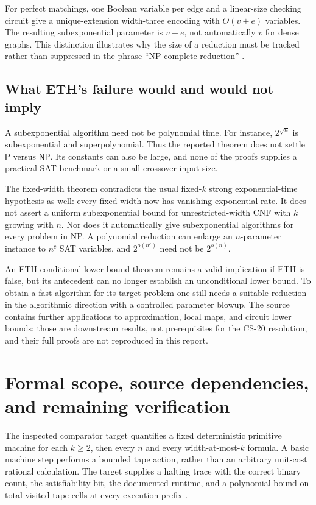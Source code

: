 \documentclass[11pt,a4paper]{article}
\numberwithin{equation}{section}
\theoremstyle{definition}
\theoremstyle{remark}
\begin{document}
For perfect matchings, one Boolean variable per edge and a linear-size
checking circuit give a unique-extension width-three encoding with
$O(v+e)$ variables. The resulting subexponential parameter is $v+e$, not
automatically $v$ for dense graphs. This distinction illustrates why the
size of a reduction must be tracked rather than suppressed in the phrase
``NP-complete reduction'' \cite{paper}.

\subsection{What ETH's failure would and would not imply}
A subexponential algorithm need not be polynomial time. For instance,
$2^{\sqrt n}$ is subexponential and superpolynomial. Thus the reported theorem
does not settle $\mathsf P$ versus $\mathsf{NP}$. Its constants can also be
large, and none of the proofs supplies a practical SAT benchmark or a small
crossover input size.

The fixed-width theorem contradicts the usual fixed-$k$ strong exponential-time
hypothesis as well: every fixed width now has vanishing exponential rate.
It does not assert a uniform subexponential bound for unrestricted-width CNF
with $k$ growing with $n$. Nor does it automatically give subexponential
algorithms for every problem in NP. A polynomial reduction can enlarge an
$n$-parameter instance to $n^c$ SAT variables, and $2^{o(n^c)}$ need not be
$2^{o(n)}$.

An ETH-conditional lower-bound theorem remains a valid implication if ETH is
false, but its antecedent can no longer establish an unconditional lower bound.
To obtain a fast algorithm for its target problem one still needs a suitable
reduction in the algorithmic direction with a controlled parameter blowup.
The source contains further applications to approximation, local maps, and
circuit lower bounds; those are downstream results, not prerequisites for
the CS-20 resolution, and their full proofs are not reproduced in this report.

\section{Formal scope, source dependencies, and remaining verification}
\label{sec:formal}
The inspected comparator target quantifies a fixed deterministic primitive
machine for each $k\ge2$, then every $n$ and every width-at-most-$k$ formula.
A basic machine step performs a bounded tape action, rather than an arbitrary
unit-cost rational calculation. The target supplies a halting trace with the
correct binary count, the satisfiability bit, the documented runtime, and a
polynomial bound on total visited tape cells at every execution prefix
\cite{challenge}.
\end{document}
